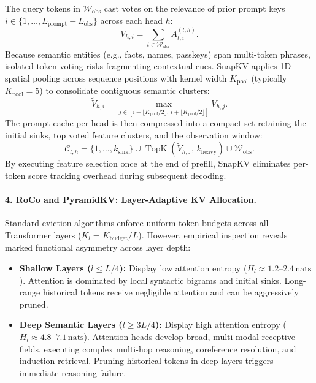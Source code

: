 The query tokens in $\mathcal{W}_{\text{obs}}$ cast votes on the relevance of prior prompt keys $i \in \{1, \dots, L_{\text{prompt}} - L_{\text{obs}}\}$ across each head $h$:
\begin{equation}
\label{eq:snapkv_voting_formal}
V_{h, i} = \sum_{t \in \mathcal{W}_{\text{obs}}} A_{t, i}^{(l, h)}.
\end{equation}
Because semantic entities (e.g., facts, names, passkeys) span multi-token phrases, isolated token voting risks fragmenting contextual cues. SnapKV applies 1D spatial pooling across sequence positions with kernel width $K_{\text{pool}}$ (typically $K_{\text{pool}} = 5$) to consolidate contiguous semantic clusters:
\begin{equation}
\label{eq:snapkv_pooling_formal}
\widetilde{V}_{h, i} = \max_{j \in \left[ i - \lfloor K_{\text{pool}}/2 \rfloor, \, i + \lfloor K_{\text{pool}}/2 \rfloor \right]} V_{h, j}.
\end{equation}
The prompt cache per head is then compressed into a compact set retaining the initial sinks, top voted feature clusters, and the observation window:
\begin{equation}
\label{eq:snapkv_retention_set}
\mathcal{C}_{l, h} = \{1, \dots, k_{\text{sink}}\} \cup \operatorname{TopK}\left( \widetilde{V}_{h, :}, \, k_{\text{heavy}} \right) \cup \mathcal{W}_{\text{obs}}.
\end{equation}
By executing feature selection once at the end of prefill, SnapKV eliminates per-token score tracking overhead during subsequent decoding.

\paragraph{4. RoCo and PyramidKV: Layer-Adaptive KV Allocation.}
Standard eviction algorithms enforce uniform token budgets across all Transformer layers ($K_l = K_{\text{budget}} / L$). However, empirical inspection reveals marked functional asymmetry across layer depth:
\begin{itemize}
    \item \textbf{Shallow Layers ($l \le L/4$):} Display low attention entropy ($H_l \approx 1.2\text{--}2.4\,\text{nats}$). Attention is dominated by local syntactic bigrams and initial sinks. Long-range historical tokens receive negligible attention and can be aggressively pruned.
    \item \textbf{Deep Semantic Layers ($l \ge 3L/4$):} Display high attention entropy ($H_l \approx 4.8\text{--}7.1\,\text{nats}$). Attention heads develop broad, multi-modal receptive fields, executing complex multi-hop reasoning, coreference resolution, and induction retrieval. Pruning historical tokens in deep layers triggers immediate reasoning failure.
\end{itemize}

